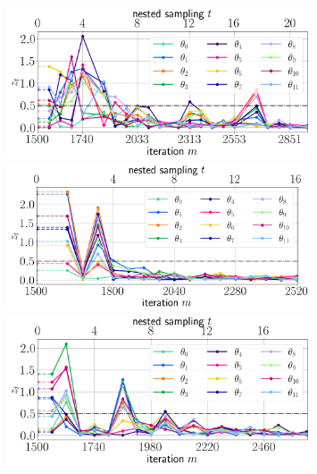 \documentclass[twocolumn,twocolappendix]{aastex63}
\begin{document}
\begin{figure}[!ht]
    \centering
    \includegraphics[width=0.8\textwidth]{figs/appendix/convergence/230103_064024_dynesty-sampling_convergence_z_eps0.5.png}
    \includegraphics[width=0.8\textwidth]{figs/appendix/convergence/230103_060017_dynesty-sampling_convergence_z_eps0.5.png}
    \includegraphics[width=0.8\textwidth]{figs/appendix/convergence/230622_230103_dynesty-sampling_convergence_z_eps0.5.png}
    \label{fig:convergence_multi}
\end{figure}


\end{document}
